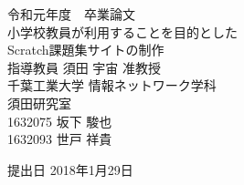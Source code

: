 \documentclass[a4j,10pt]{jsarticle}
\begin{document}
\setcounter{tocdepth}{3}
\thispagestyle{empty}
\begin{center}
\huge
令和元年度　卒業論文\\[50pt]


\HUGE
小学校教員が利用することを目的とした\\
Scratch課題集サイトの制作\\[50pt]
\huge
指導教員 須田 宇宙 准教授\\[40pt]
千葉工業大学 情報ネットワーク学科\\[10pt]
須田研究室\\[60pt]
1632075 \hspace{70pt} 坂下 駿也\\[75pt]
1632093 \hspace{70pt} 世戸 祥貴\\[75pt]
\end{center}
\begin{flushright}
\huge



提出日 2018年1月29日
\end{flushright}
\newpage


\pagestyle{empty}
\large
\tableofcontents
\listoftables
\listoffigures
\newpage


\pagestyle{plain}
\setcounter{page}{1}

























\end{document}

